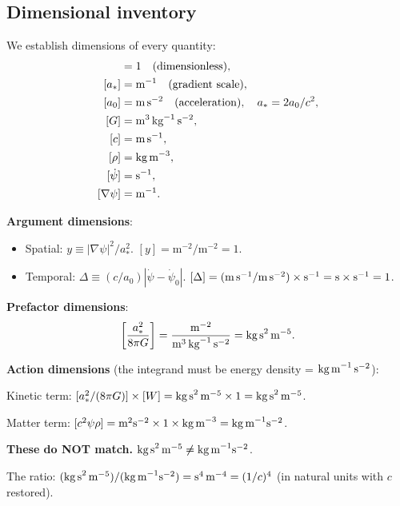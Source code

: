 \documentclass[11pt]{article}
\begin{document}
\subsection{Dimensional inventory}

We establish dimensions of every quantity:
\begin{align}
[\psi] &= 1 \quad (\text{dimensionless}), \\
[a_*] &= \text{m}^{-1} \quad (\text{gradient scale}), \\
[a_0] &= \text{m\,s}^{-2} \quad (\text{acceleration}), \quad a_* = 2a_0/c^2, \\
[G] &= \text{m}^3\,\text{kg}^{-1}\,\text{s}^{-2}, \\
[c] &= \text{m\,s}^{-1}, \\
[\rho] &= \text{kg\,m}^{-3}, \\
[\dot\psi] &= \text{s}^{-1}, \\
[\nabla\psi] &= \text{m}^{-1}.
\end{align}

\textbf{Argument dimensions}:
\begin{itemize}[nosep]
\item Spatial: $y \equiv |\nabla\psi|^2/a_*^2$. $[y] = \text{m}^{-2}/\text{m}^{-2} = 1$. \checkmark
\item Temporal: $\Delta \equiv (c/a_0)|\dot\psi - \dot\psi_0|$. $[\Delta] = (\text{m\,s}^{-1}/\text{m\,s}^{-2}) \times \text{s}^{-1} = \text{s} \times \text{s}^{-1} = 1$. \checkmark
\end{itemize}

\textbf{Prefactor dimensions}:
\begin{equation}
\biggl[\frac{a_*^2}{8\pi G}\biggr] = \frac{\text{m}^{-2}}{\text{m}^3\,\text{kg}^{-1}\,\text{s}^{-2}}
= \text{kg\,s}^2\,\text{m}^{-5}.
\end{equation}

\textbf{Action dimensions} (the integrand must be energy density = $\text{kg\,m}^{-1}\,\text{s}^{-2}$):

Kinetic term: $[a_*^2/(8\pi G)] \times [W] = \text{kg\,s}^2\,\text{m}^{-5} \times 1 = \text{kg\,s}^2\,\text{m}^{-5}$.

Matter term: $[c^2 \psi \rho] = \text{m}^2\text{s}^{-2} \times 1 \times \text{kg\,m}^{-3} = \text{kg\,m}^{-1}\text{s}^{-2}$.

\textbf{These do NOT match.} $\text{kg\,s}^2\,\text{m}^{-5} \neq \text{kg\,m}^{-1}\text{s}^{-2}$.

The ratio: $(\text{kg\,s}^2\,\text{m}^{-5})/(\text{kg\,m}^{-1}\text{s}^{-2}) = \text{s}^4\,\text{m}^{-4} = (1/c)^4$ (in natural units with $c$ restored).
\end{document}
